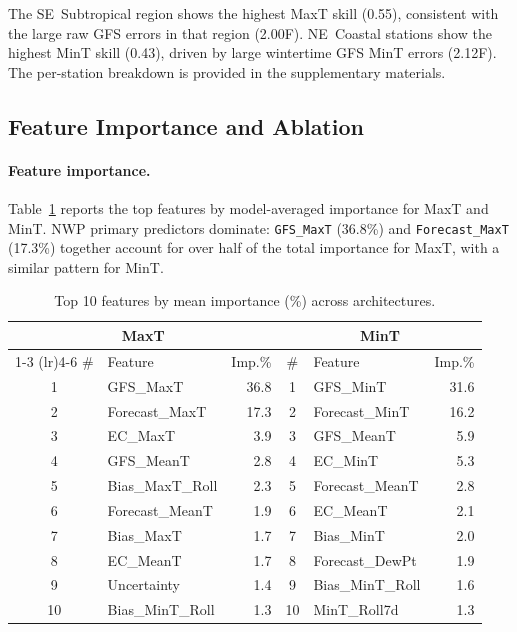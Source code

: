 \documentclass[12pt, letterpaper]{article}
\begin{document}
The SE~Subtropical region shows the highest MaxT skill (0.55), consistent with
the large raw GFS errors in that region (2.00\textdegree{}F). NE~Coastal stations
show the highest MinT skill (0.43), driven by large wintertime GFS MinT errors
(2.12\textdegree{}F). The per-station breakdown is provided in the supplementary
materials.

\subsection{Feature Importance and Ablation}
\label{sec:results_features}

\paragraph{Feature importance.}
Table~\ref{tab:features} reports the top features by model-averaged importance for
MaxT and MinT. NWP primary predictors dominate: \texttt{GFS\_MaxT} (36.8\%) and
\texttt{Forecast\_MaxT} (17.3\%) together account for over half of the total
importance for MaxT, with a similar pattern for MinT.

\begin{table}[ht]
\centering
\caption{Top 10 features by mean importance (\%) across architectures.}
\label{tab:features}
\small
\begin{tabular}{clr@{\hspace{2em}}clr}
\toprule
\multicolumn{3}{c}{MaxT} & \multicolumn{3}{c}{MinT} \\
\cmidrule(lr){1-3} \cmidrule(lr){4-6}
\# & Feature & Imp.\% & \# & Feature & Imp.\% \\
\midrule
1 & GFS\_MaxT        & 36.8 & 1 & GFS\_MinT        & 31.6 \\
2 & Forecast\_MaxT   & 17.3 & 2 & Forecast\_MinT   & 16.2 \\
3 & EC\_MaxT         &  3.9 & 3 & GFS\_MeanT       &  5.9 \\
4 & GFS\_MeanT       &  2.8 & 4 & EC\_MinT         &  5.3 \\
5 & Bias\_MaxT\_Roll &  2.3 & 5 & Forecast\_MeanT  &  2.8 \\
6 & Forecast\_MeanT  &  1.9 & 6 & EC\_MeanT        &  2.1 \\
7 & Bias\_MaxT       &  1.7 & 7 & Bias\_MinT       &  2.0 \\
8 & EC\_MeanT        &  1.7 & 8 & Forecast\_DewPt  &  1.9 \\
9 & Uncertainty      &  1.4 & 9 & Bias\_MinT\_Roll &  1.6 \\
10 & Bias\_MinT\_Roll &  1.3 & 10 & MinT\_Roll7d    &  1.3 \\
\bottomrule
\end{tabular}
\end{table}
\end{document}
